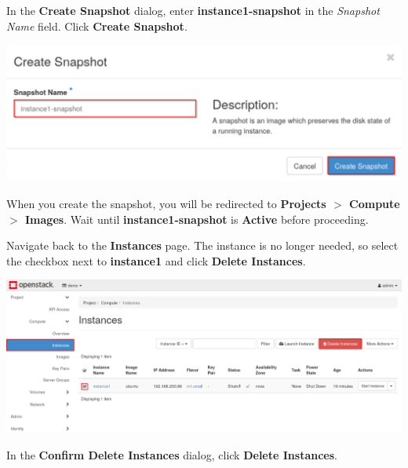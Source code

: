 \documentclass[letterpaper, 12pt]{article}
\begin{document}
\begin{enumerate}
    \begin{labstep}
        In the \textbf{Create Snapshot} dialog, enter \textbf{instance1-snapshot} in the \textit{Snapshot Name} field.
        Click \textbf{Create Snapshot}.

        \begin{center}
            \includegraphics[width=\linewidth]{images/part1/step14.png}
        \end{center}
    \end{labstep}

    \begin{stopbox}
        When you create the snapshot, you will be redirected to \textbf{Projects $>$ Compute $>$ Images}.
        Wait until \textbf{instance1-snapshot} is \textbf{Active} before proceeding.
    \end{stopbox}

    \begin{labstep}
        Navigate back to the \textbf{Instances} page.
        The instance is no longer needed, so select the checkbox next to \textbf{instance1} and click \textbf{Delete Instances}.

        \begin{center}
            \includegraphics[width=\linewidth]{images/part1/step15.png}
        \end{center}
    \end{labstep}

    \begin{labstep}
        In the \textbf{Confirm Delete Instances} dialog, click \textbf{Delete Instances}.


\end{labstep}
\end{enumerate}
\end{document}
